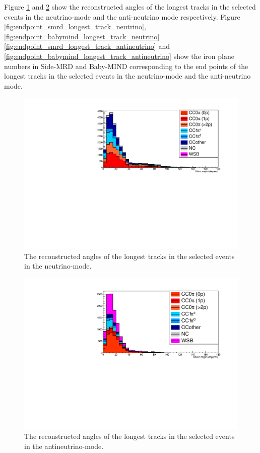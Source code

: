 Figure \ref{fig:angle_allcut_neutrino} and \ref{fig:angle_allcut_antineutrino} show the reconstructed angles of the longest tracks in the selected events in the neutrino-mode and the anti-neutrino mode respectively.
Figure \ref{fig:endpoint_smrd_longest_track_neutrino}, \ref{fig:endpoint_babymind_longest_track_neutrino} \ref{fig:endpoint_smrd_longest_track_antineutrino} and \ref{fig:endpoint_babymind_longest_track_antineutrino} show the iron plane numbers in Side-MRD and Baby-MIND corresponding to the end points of the longest tracks in the selected events in the neutrino-mode and the anti-neutrino mode.

\begin{figure}[tbh]
\begin{center}
\includegraphics[width=0.5\linewidth, angle=270]{fig/FHCMuonAngle_StoppedOrThroughGoing.pdf}
\end{center}
\caption{
The reconstructed angles of the longest tracks in the selected events in the neutrino-mode.
}
\label{fig:angle_allcut_neutrino}
\end{figure}

\begin{figure}[tbh]
\begin{center}
\includegraphics[width=0.5\linewidth, angle=270]{fig/RHCMuonAngle_StoppedOrThroughGoing.pdf}
\end{center}
\caption{
The reconstructed angles of the longest tracks in the selected events in the antineutrino-mode.
}
\label{fig:angle_allcut_antineutrino}
\end{figure}

